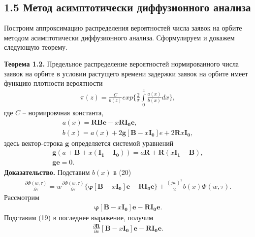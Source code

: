 \subsection{1.5 Метод асимптотически диффузионного анализа}
Построим аппроксимацию распределения вероятностей числа заявок на орбите методом асимптотически диффузионного анализа. Сформулируем и докажем следующую теорему.

\textbf{Теорема 1.2.} Предельное распределение вероятностей нормированного числа заявок на орбите в условии растущего времени задержки заявок на орбите имеет функцию плотности вероятности
\begin{align}
	\pi (z)= \frac{C}{b(z)}exp\bigg\{\frac{2}{\sigma} \int\limits_0^z \frac{a(x)}{b(x)}dx\bigg\},
\end{align} 
где $C$ -- нормировчная константа,
\begin{equation}
	\begin{split}
		a(x)=\boldsymbol{RBe}-x\boldsymbol{RI_{0}e},\\
		b(x)=a(x)+2\boldsymbol{g}[\boldsymbol{B}-x\boldsymbol{I_{0}}]e+2\boldsymbol{R}x\boldsymbol{I_{0}},
	\end{split}
\end{equation}
здесь вектор-строка $\boldsymbol{g}$ определяется системой уравнений
\begin{equation}
	\begin{split}
		\boldsymbol{g}(a+\boldsymbol{B}+x(\boldsymbol{I_{1}}-\boldsymbol{I_{0}}))=a\boldsymbol{R}+\boldsymbol{R}(x\boldsymbol{I_{1}}-\boldsymbol{B}),\\
		\boldsymbol{ge}=0.
	\end{split}
\end{equation}
\hspace*{\parindent}%
\textbf{Доказательство.} Подставим $b(x)$ в (20)
\begin{align}
	\frac{\partial \Phi (w,\tau)}{\partial \tau}=w\frac{\partial \Phi (w,\tau)}{\partial \tau} \bigg\{\boldsymbol{\varphi}[\boldsymbol{B}-x\boldsymbol{I_{0}}] \boldsymbol{e}-\boldsymbol{RI_{0}e}\bigg\}+\frac{(jw)^2}{2}b(x)\Phi(w,\tau).
\end{align}
Рассмотрим
\begin{align*}
	\boldsymbol{\varphi}[\boldsymbol{B}-x\boldsymbol{I_{0}}] \boldsymbol{e}-\boldsymbol{RI_{0}e}.
\end{align*}
Подставим (19) в последнее выражение, получим
\begin{align}
	\frac{\partial \boldsymbol{R}}{\partial x}[\boldsymbol{B}-x\boldsymbol{I_{0}}] \boldsymbol{e}-\boldsymbol{RI_{0}e}.
\end{align}
